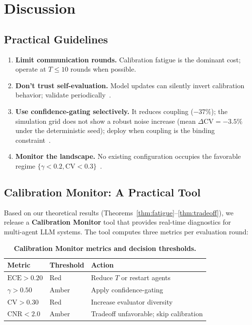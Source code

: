 \documentclass[11pt]{article}
\newcommand{\CV}{\ensuremath{\mathrm{CV}}}
\newcommand{\ECE}{\ensuremath{\mathrm{ECE}}}
\theoremstyle{definition}
\theoremstyle{remark}
\begin{document}
\section{Discussion}

\subsection{Practical Guidelines}

\begin{enumerate}[leftmargin=*,nosep]
    \item \textbf{Limit communication rounds.} Calibration fatigue is the dominant cost; operate at $T \leq 10$ rounds when possible.
    \item \textbf{Don't trust self-evaluation.} Model updates can silently invert calibration behavior; validate periodically~\citep{zhou2024incontext}.
    \item \textbf{Use confidence-gating selectively.} It reduces coupling ($-37\%$); the simulation grid does not show a robust noise increase (mean $\Delta\CV = -3.5\%$ under the deterministic seed); deploy when coupling is the binding constraint~\citep{chen2025unicr}.
    \item \textbf{Monitor the landscape.} No existing configuration occupies the favorable regime $\{\gamma < 0.2, \CV < 0.3\}$~\citep{caleffects2026}.
\end{enumerate}

\subsection{Calibration Monitor: A Practical Tool}

Based on our theoretical results (Theorems~\ref{thm:fatigue}--\ref{thm:tradeoff}), we release a \textbf{Calibration Monitor} tool that provides real-time diagnostics for multi-agent LLM systems. The tool computes three metrics per evaluation round:

\begin{table}[H]
\centering
\caption{\textbf{Calibration Monitor metrics and decision thresholds.}}
\begin{tabular}{@{}lll@{}}
\toprule
Metric & Threshold & Action \\
\midrule
$\ECE > 0.20$ & Red & Reduce $T$ or restart agents \\
$\gamma > 0.50$ & Amber & Apply confidence-gating \\
$\CV > 0.30$ & Red & Increase evaluator diversity \\
$\text{CNR} < 2.0$ & Amber & Tradeoff unfavorable; skip calibration \\
\bottomrule
\end{tabular}
\end{table}
\end{document}
